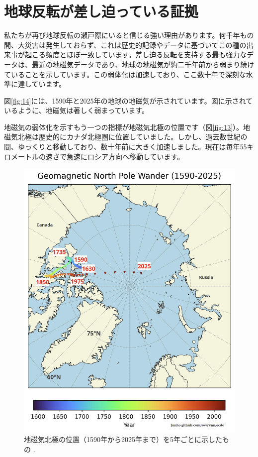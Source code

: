 \documentclass[10pt,twocolumn,letterpaper]{article}
\begin{document}
\section{地球反転が差し迫っている証拠}

私たちが再び地球反転の瀬戸際にいると信じる強い理由があります。何千年もの間、大災害は発生しておらず、これは歴史的記録やデータに基づいてこの種の出来事が起こる頻度とほぼ一致しています。差し迫る反転を支持する最も強力なデータは、最近の地磁気データであり、地球の地磁気が約二千年前から弱まり続けていることを示しています。この弱体化は加速しており、ここ数十年で深刻な水準に達しています。

図\ref{fig:14}には、1590年と2025年の地球の地磁気が示されています\cite{125,126}。図に示されているように、地磁気は著しく弱まっています。

地磁気の弱体化を示すもう一つの指標が地磁気北極の位置です（図\ref{fig:13}）。地磁気北極は歴史的にカナダ北極圏に位置していました。しかし、過去数世紀の間、ゆっくりと移動しており、数十年前に大きく加速しました。現在は毎年55キロメートルの速さで急速にロシア方向へ移動しています\cite{124}。

\begin{figure}[b]
\begin{center}
   \includegraphics[width=1\linewidth]{npw.jpg}
\end{center}
   \caption{地磁気北極の位置（1590年から2025年まで）を5年ごとに示したもの \cite{142}.}
\label{fig:13}
\label{fig:onecol}
\end{figure}
\end{document}

